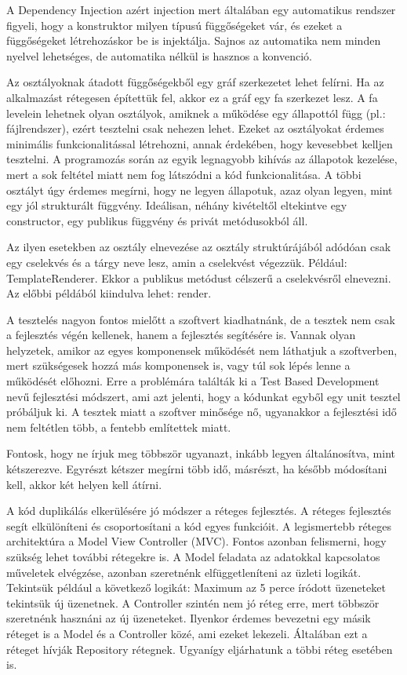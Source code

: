 \documentclass[a4paper,12pt,oneside]{report}
\begin{document}
\begin{justify}
	A Dependency Injection azért injection mert általában egy automatikus rendszer figyeli, hogy a konstruktor milyen típusú függőségeket vár, és ezeket a függőségeket létrehozáskor be is injektálja. Sajnos az automatika nem minden nyelvel lehetséges, de automatika nélkül is hasznos a konvenció. \cite{website:dependency_injection_without_container}

	Az osztályoknak átadott függőségekből egy gráf szerkezetet lehet felírni. Ha az alkalmazást rétegesen építettük fel, akkor ez a gráf egy fa szerkezet lesz. A fa levelein lehetnek olyan osztályok, amiknek a működése egy állapottól függ (pl.: fájlrendszer), ezért tesztelni csak nehezen lehet. Ezeket az osztályokat érdemes minimális funkcionalitással létrehozni, annak érdekében, hogy kevesebbet kelljen tesztelni. A programozás során az egyik legnagyobb kihívás az állapotok kezelése, mert a sok feltétel miatt nem fog látszódni a kód funkcionalitása. A többi osztályt úgy érdemes megírni, hogy ne legyen állapotuk, azaz olyan legyen, mint egy jól strukturált függvény. Ideálisan, néhány kivételtől eltekintve egy constructor, egy publikus függvény és privát metódusokból áll. 

	Az ilyen esetekben az osztály elnevezése az osztály struktúrájából adódóan csak egy cselekvés és a tárgy neve lesz, amin a cselekvést végezzük. Például: TemplateRenderer. Ekkor a publikus metódust célszerű a cselekvésről elnevezni. Az előbbi példából kiindulva lehet: render. 

	A tesztelés nagyon fontos mielőtt a szoftvert kiadhatnánk, de a tesztek nem csak a fejlesztés végén kellenek, hanem a fejlesztés segítésére is. Vannak olyan helyzetek, amikor az egyes komponensek működését nem láthatjuk a szoftverben, mert szükségesek hozzá más komponensek is, vagy túl sok lépés lenne a működését előhozni. Erre a problémára találták ki a Test Based Development nevű fejlesztési módszert, ami azt jelenti, hogy a kódunkat egyből egy unit tesztel próbáljuk ki. A tesztek miatt a szoftver minősége nő, ugyanakkor a fejlesztési idő nem feltétlen több, a fentebb említettek miatt.

	Fontosk, hogy ne írjuk meg többször ugyanazt, inkább legyen általánosítva, mint kétszerezve. Egyrészt kétszer megírni több idő, másrészt, ha később módosítani kell, akkor két helyen kell átírni. 

	A kód duplikálás elkerülésére jó módszer a réteges fejlesztés. A réteges fejlesztés segít elkülöníteni és csoportosítani a kód egyes funkcióit. A legismertebb réteges architektúra a Model View Controller (MVC). Fontos azonban felismerni, hogy szükség lehet további rétegekre is. A Model feladata az adatokkal kapcsolatos műveletek elvégzése, azonban szeretnénk elfüggetleníteni az üzleti logikát. Tekintsük például a következő logikát: Maximum az 5 perce íródott üzeneteket tekintsük új üzenetnek. A Controller szintén nem jó réteg erre, mert többször szeretnénk hasznáni az új üzeneteket. Ilyenkor érdemes bevezetni egy másik réteget is a Model és a Controller közé, ami ezeket lekezeli. Általában ezt a réteget hívják Repository rétegnek. Ugyanígy eljárhatunk a többi réteg esetében is.


\end{justify}
\end{document}
